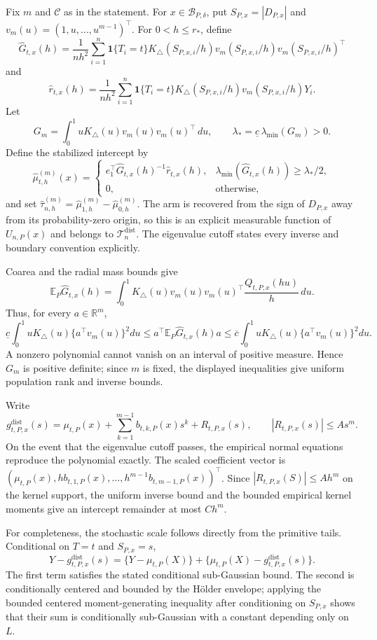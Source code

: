 Fix \(m\) and \(\mathcal C\) as in the statement.  For \(x\in\mathcal B_{P,\delta}\), put \(S_{P,x}=|D_{P,x}|\) and \(v_m(u)=(1,u,\ldots,u^{m-1})^\top\).  For \(0<h\leq r_*\), define
\[
 \widehat G_{t,x}(h)=\frac1{nh^2}\sum_{i=1}^n\mathbf1\{T_i=t\}
 K_\triangle(S_{P,x,i}/h)v_m(S_{P,x,i}/h)v_m(S_{P,x,i}/h)^\top
\]
and
\[
 \widehat r_{t,x}(h)=\frac1{nh^2}\sum_{i=1}^n\mathbf1\{T_i=t\}
 K_\triangle(S_{P,x,i}/h)v_m(S_{P,x,i}/h)Y_i.
\]
Let
\[
 G_m=\int_0^1uK_\triangle(u)v_m(u)v_m(u)^\top\,du,
 \qquad \lambda_* =\underline c\,\lambda_{\min}(G_m)>0.
\]
Define the stabilized intercept by
\[
 \widehat\mu^{(m)}_{t,h}(x)=
 \begin{cases}
 e_1^\top\widehat G_{t,x}(h)^{-1}\widehat r_{t,x}(h),
 &\lambda_{\min}(\widehat G_{t,x}(h))\geq\lambda_*/2,\\
 0,&\text{otherwise},
 \end{cases}
\]
and set \(\widehat\tau^{(m)}_{n,h}=\widehat\mu^{(m)}_{1,h}-\widehat\mu^{(m)}_{0,h}\).  The arm is recovered from the sign of \(D_{P,x}\) away from its probability-zero origin, so this is an explicit measurable function of \(U_{n,P}(x)\) and belongs to \(\mathcal T_n^{\mathrm{dist}}\).  The eigenvalue cutoff states every inverse and boundary convention explicitly.

Coarea and the radial mass bounds give
\[
 \mathbb E_P\widehat G_{t,x}(h)
 =\int_0^1K_\triangle(u)v_m(u)v_m(u)^\top
 \frac{Q_{t,P,x}(hu)}h\,du.
\]
Thus, for every \(a\in\mathbb R^m\),
\[
 \underline c\int_0^1uK_\triangle(u)\{a^\top v_m(u)\}^2du
 \leq a^\top\mathbb E_P\widehat G_{t,x}(h)a
 \leq\overline c\int_0^1uK_\triangle(u)\{a^\top v_m(u)\}^2du.
\]
A nonzero polynomial cannot vanish on an interval of positive measure.  Hence \(G_m\) is positive definite; since \(m\) is fixed, the displayed inequalities give uniform population rank and inverse bounds.

Write
\[
 g^{\mathrm{dist}}_{t,P,x}(s)
 =\mu_{t,P}(x)+\sum_{k=1}^{m-1}b_{t,k,P}(x)s^k+R_{t,P,x}(s),
 \qquad |R_{t,P,x}(s)|\leq As^m.
\]
On the event that the eigenvalue cutoff passes, the empirical normal equations reproduce the polynomial exactly.  The scaled coefficient vector is
\((\mu_{t,P}(x),h b_{t,1,P}(x),\ldots,h^{m-1}b_{t,m-1,P}(x))^\top\).  Since \(|R_{t,P,x}(S)|\leq Ah^m\) on the kernel support, the uniform inverse bound and the bounded empirical kernel moments give an intercept remainder at most \(Ch^m\).

For completeness, the stochastic scale follows directly from the primitive tails.  Conditional on \(T=t\) and \(S_{P,x}=s\),
\[
 Y-g^{\mathrm{dist}}_{t,P,x}(s)
 =\{Y-\mu_{t,P}(X)\}
 +\{\mu_{t,P}(X)-g^{\mathrm{dist}}_{t,P,x}(s)\}.
\]
The first term satisfies the stated conditional sub-Gaussian bound.  The second is conditionally centered and bounded by the H\"older envelope; applying the bounded centered moment-generating inequality after conditioning on \(S_{P,x}\) shows that their sum is conditionally sub-Gaussian with a constant depending only on \(L\).

